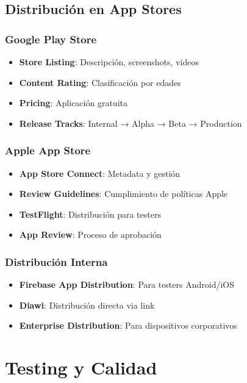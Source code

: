 \documentclass[12pt]{article}
\begin{document}
\subsection{Distribución en App Stores}

\subsubsection{Google Play Store}
\begin{itemize}
    \item \textbf{Store Listing}: Descripción, screenshots, videos
    \item \textbf{Content Rating}: Clasificación por edades
    \item \textbf{Pricing}: Aplicación gratuita
    \item \textbf{Release Tracks}: Internal → Alpha → Beta → Production
\end{itemize}

\subsubsection{Apple App Store}
\begin{itemize}
    \item \textbf{App Store Connect}: Metadata y gestión
    \item \textbf{Review Guidelines}: Cumplimiento de políticas Apple
    \item \textbf{TestFlight}: Distribución para testers
    \item \textbf{App Review}: Proceso de aprobación
\end{itemize}

\subsubsection{Distribución Interna}
\begin{itemize}
    \item \textbf{Firebase App Distribution}: Para testers Android/iOS
    \item \textbf{Diawi}: Distribución directa via link
    \item \textbf{Enterprise Distribution}: Para dispositivos corporativos
\end{itemize}

\section{Testing y Calidad}
\label{sec:testing}
\end{document}
